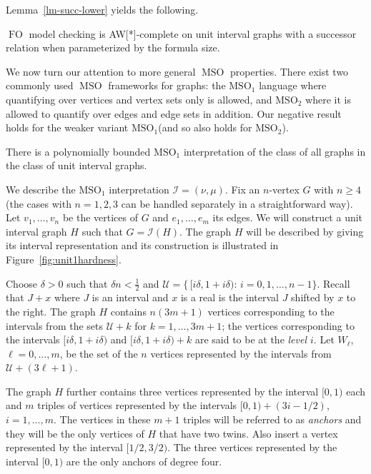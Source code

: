 \documentclass{CSML}
\def\ca#1{{\mathcal#1}}
\newcommand{\FO}{\ensuremath{\operatorname{FO}}\xspace}
\newcommand{\MSO}{\ensuremath{\operatorname{MSO}}\xspace}
\newcommand{\MSOi}{\ensuremath{\operatorname{MSO_1}}\xspace}
\newcommand{\MSOii}{\ensuremath{\operatorname{MSO_2}}\xspace}
\newcommand{\cI}{\mathcal{I}}
\theoremstyle{plain}\newtheorem{claim}[thm]{Claim}
\begin{document}
Lemma~\ref{lm-succ-lower} yields the following.

\begin{cor}
\label{cor-succFO}
\FO model checking is AW[*]-complete on unit interval graphs with a successor relation
when parameterized by the formula size.
\end{cor}

We now turn our attention to more general \MSO properties.
There exist two commonly used \MSO frameworks for graphs:
the \MSOi language where quantifying over vertices and vertex sets only is allowed, and
\MSOii where it is allowed to quantify over edges and edge sets in addition.
Our negative result holds for the weaker variant \MSOi (and so also holds for \MSOii).

\begin{lem}
\label{lem:1MSO1}
There is a polynomially bounded \MSOi interpretation of the class of all graphs in the class of unit interval graphs.
\end{lem}

\proof
We describe the \MSOi interpretation $\cI=(\nu,\mu)$.
Fix an $n$-vertex $G$ with $n\ge 4$ (the cases with $n=1,2,3$ can be handled separately in a straightforward way).
Let $v_1,\ldots,v_n$ be the vertices of $G$ and $e_1,\ldots,e_m$ its edges.
We will construct a unit interval graph $H$ such that $G=\cI(H)$.
The graph $H$ will be described by giving its interval representation and
its construction is illustrated in Figure~\ref{fig:unit1hardness}.

Choose $\delta>0$ such that $\delta n<\frac12$ and
$\ca U=\big\{\, [i\delta,1+i\delta):\, i=0,1,\dots,n-1\big\}$.
Recall that $J+x$ where $J$ is an interval and $x$ is a real
is the interval $J$ shifted by $x$ to the right.
The graph $H$ contains $n(3m+1)$ vertices corresponding to the intervals from the sets $\ca U+k$ for $k=1,\ldots,3m+1$;
the vertices corresponding to the intervals $[i\delta,1+i\delta)$ and $[i\delta,1+i\delta)+k$ are said to be at the {\em level $i$}.
Let $W_\ell$, $\ell=0,\ldots,m$, be the set of the $n$ vertices represented by the intervals from $\ca U+(3\ell+1)$.

The graph $H$ further contains three vertices represented by the interval $[0,1)$ each and
$m$ triples of vertices represented by the intervals $[0,1)+(3i-1/2)$, $i=1,\ldots,m$.
The vertices in these $m+1$ triples will be referred to as {\em anchors} and
they will be the only vertices of $H$ that have two twins.
Also insert a vertex represented by the interval $[1/2,3/2)$.
The three vertices represented by the interval $[0,1)$ are the only anchors of degree four.
\end{document}
